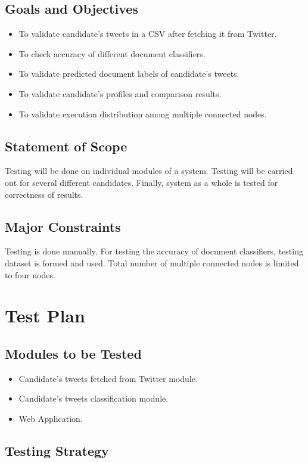 \documentclass[oneside,a4paper,12pt]{pictreport}
\begin{document}
\subsection{Goals and Objectives}
\begin{itemize}
\item To validate candidate's tweets in a CSV after fetching it from Twitter.
\item To check accuracy of different document classifiers.
\item To validate predicted document labels of candidate's tweets.
\item To validate candidate's profiles and comparison results.
\item To validate execution distribution among multiple connected nodes.
\end{itemize}

\subsection{Statement of Scope}
Testing will be done on individual modules of a system. Testing will be carried out for several different candidates. Finally, system as a whole is tested for correctness of results. 

\subsection{Major Constraints}
Testing is done manually. For testing the accuracy of document classifiers, testing dataset is formed and used. Total number of multiple connected nodes is limited to four nodes.

\section{Test Plan}
\subsection{Modules to be Tested}
\begin{itemize}
\item Candidate's tweets fetched from Twitter module.
\item Candidate's tweets classification module.
\item Web Application.
\end{itemize}

\subsection{Testing Strategy}
\end{document}
